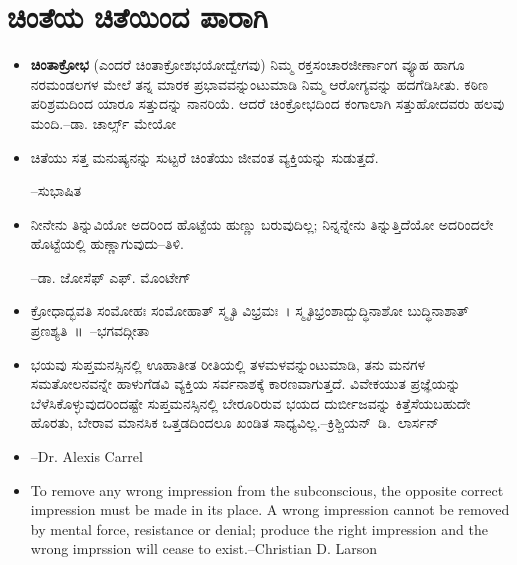 
\chapter{ಚಿಂತೆಯ ಚಿತೆಯಿಂದ ಪಾರಾಗಿ}

\indentsecionsintoc

\begin{itemize}
\item \textbf{ಚಿಂತಾಕ್ರೋಭ} (ಎಂದರೆ ಚಿಂತಾಕ್ರೋಶಭಯೋದ್ವೇಗವು) ನಿಮ್ಮ ರಕ್ತಸಂಚಾರ\break ಜೀರ್ಣಾಂಗ ವ್ಯೂಹ ಹಾಗೂ ನರಮಂಡಲಗಳ ಮೇಲೆ ತನ್ನ ಮಾರಕ ಪ್ರಭಾವವನ್ನುಂಟು\-ಮಾಡಿ ನಿಮ್ಮ ಆರೋಗ್ಯವನ್ನು ಹದಗೆಡಿಸೀತು. ಕಠಿಣ ಪರಿಶ್ರಮದಿಂದ ಯಾರೂ ಸತ್ತುದನ್ನು ನಾನರಿಯೆ. ಆದರೆ ಚಿಂಕ್ರೋಭದಿಂದ ಕಂಗಾಲಾಗಿ ಸತ್ತುಹೋದವರು ಹಲವು ಮಂದಿ.\hfill–ಡಾ. ಚಾರ್ಲ್ಸ್ ಮೇಯೋ

 \item ಚಿತೆಯು ಸತ್ತ ಮನುಷ್ಯನನ್ನು ಸುಟ್ಟರೆ ಚಿಂತೆಯು ಜೀವಂತ ವ್ಯಕ್ತಿಯನ್ನು ಸುಡುತ್ತದೆ.

 \general{~\hfill}–ಸುಭಾಷಿತ

 \item ನೀನೇನು ತಿನ್ನುವಿಯೋ ಅದರಿಂದ ಹೊಟ್ಟೆಯ ಹುಣ್ಣು ಬರುವುದಿಲ್ಲ; ನಿನ್ನನ್ನೇನು ತಿನ್ನುತ್ತಿದೆಯೋ ಅದರಿಂದಲೇ ಹೊಟ್ಟೆಯಲ್ಲಿ ಹುಣ್ಣಾಗುವುದು–ತಿಳಿ.

 \general{~\hfill}–ಡಾ. ಜೋಸೆಫ್ ಎಫ್. ಮೊಂಟೇಗ್​

 \item ಕ್ರೋಧಾದ್ಭವತಿ ಸಂಮೋಹಃ ಸಂಮೋಹಾತ್ ಸ್ಮೃತಿ ವಿಭ್ರಮಃ~। ಸ್ಮೃತಿಭ್ರಂಶಾದ್ಬುದ್ಧಿ\-ನಾಶೋ ಬುದ್ಧಿನಾಶಾತ್ ಪ್ರಣಶ್ಯತಿ~॥~\hfill–ಭಗವದ್ಗೀತಾ

 \item ಭಯವು ಸುಪ್ತಮನಸ್ಸಿನಲ್ಲಿ ಊಹಾತೀತ ರೀತಿಯಲ್ಲಿ ತಳಮಳವನ್ನುಂಟುಮಾಡಿ, ತನು ಮನಗಳ ಸಮತೋಲನವನ್ನೇ ಹಾಳುಗೆಡವಿ ವ್ಯಕ್ತಿಯ ಸರ್ವನಾಶಕ್ಕೆ ಕಾರಣವಾಗುತ್ತದೆ. ವಿವೇಕಯುತ ಪ್ರಜ್ಞೆಯನ್ನು ಬೆಳೆಸಿಕೊಳ್ಳುವುದರಿಂದಷ್ಟೇ ಸುಪ್ತಮನಸ್ಸಿನಲ್ಲಿ ಬೇರೂರಿರುವ ಭಯದ ದುರ್ಬೀಜವನ್ನು ಕಿತ್ತೆಸೆಯಬಹುದೇ ಹೊರತು, ಬೇರಾವ ಮಾನಸಿಕ ಒತ್ತಡ\-ದಿಂದಲೂ ಖಂಡಿತ ಸಾಧ್ಯವಿಲ್ಲ.\hfill\hbox{–ಕ್ರಿಶ್ಚಿಯನ್ ಡಿ.\ ಲಾರ್ಸನ್​}

 \item {}

 \general{~\hfill}–Dr. Alexis Carrel

 \item {}

 To remove any wrong impression from the subconscious, the opposite correct impression must be made in its place. A wrong impression cannot be removed by mental force, resistance or denial; produce the right impression and the wrong imprssion will cease to exist.\general{~\hfill}–Christian D. Larson


\end{itemize}
